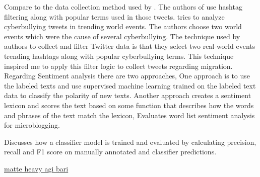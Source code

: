Compare to the data collection method used by \cite{Hübl}. The authors of \cite{Cortis} use hashtag filtering
along with popular terms used in those tweets. \cite{Cortis} tries to analyze cyberbullying tweets in trending
world events. The authors choose two world events which were the cause of several cyberbullying.
The technique used by authors to collect and filter Twitter data is that they select two real-world
events trending hashtags along with popular cyberbullying terms. This technique inspired me to
apply this filter logic to collect tweets regarding migration.
Regarding Sentiment analysis there are two approaches, One approach is to use the labeled
texts and use supervised machine learning trained on the labeled text data to classify the polarity
of new texts. Another approach creates a sentiment lexicon and scores the text based on some
function that describes how the words and phrases of the text match the lexicon, \cite{DBLP} Evaluates
word list sentiment analysis for microblogging.

 \cite{Jamie} Discusses how a classifier model is trained
and evaluated by calculating precision, recall and F1 score on manually annotated and classifier
predictions.


 \underline{matte heavy agi bari}

